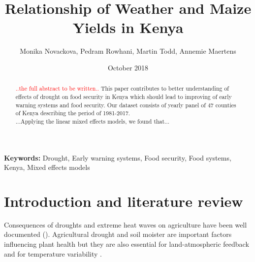 \documentclass[a4paper,12pt]{article}
\date{\normalsize{October 2018}}
\title{\Large \bf Relationship of Weather and Maize Yields in Kenya}
\author{Monika Novackova, Pedram Rowhani, Martin Todd, Annemie Maertens}
\affil{\small{Department of Geography, University of Sussex, Falmer, UK}}
\begin{document}
  

\makeatletter
\def\hlinewd#1{%
\noalign{\ifnum0=`}\fi\hrule \@height #1 %
\futurelet\reserved@a\@xhline}
\makeatother

\maketitle
\vfill

\doublespacing

\begin{abstract}
\noindent \textcolor{red}{..the full abstract to be written..} This paper contributes to better understanding of effects of drought on food security in Kenya which should lead to improving of early warning systems and food security. Our dataset consists of yearly panel of $47$ counties of Kenya describing the period of 1981-2017.
\\
...Applying the linear mixed effects models, we found that...
\end{abstract}



\noindent \textbf{Keywords:}  Drought, Early warning systems, Food security, Food systems, Kenya, Mixed effects models\\




\newpage
\sloppy


\section{Introduction and literature review}\label{Introduction}


Consequences of droughts and extreme heat waves on agriculture have been well documented (\citealp{Deschenes2007Ric,RicardianBello,Lesk2016,Mehrabi2017, schwalm2017}). Agricultural drought and soil moister are important factors influencing plant health but they are also essential for land-atmospheric feedback and for temperature variability \citep{nicolai2017}.
\end{document}

